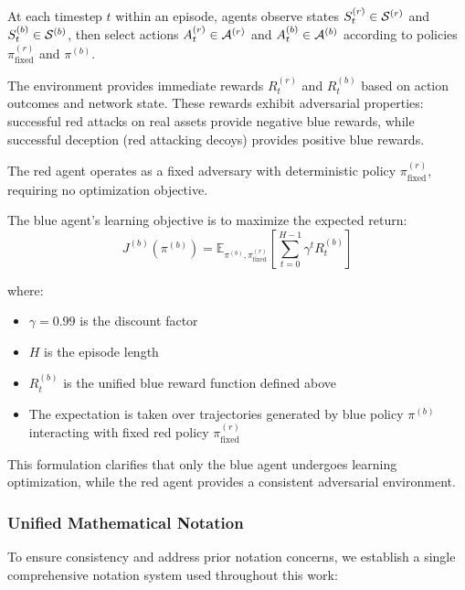\documentclass[12pt,oneside]{article}
\begin{document}
At each timestep $t$ within an episode, agents observe states $S_t^{(r)} \in \mathcal{S}^{(r)}$ and $S_t^{(b)} \in \mathcal{S}^{(b)}$, then select actions $A_t^{(r)} \in \mathcal{A}^{(r)}$ and $A_t^{(b)} \in \mathcal{A}^{(b)}$ according to policies $\pi^{(r)}_{\text{fixed}}$ and $\pi^{(b)}$.

The environment provides immediate rewards $R_t^{(r)}$ and $R_t^{(b)}$ based on action outcomes and network state. These rewards exhibit adversarial properties: successful red attacks on real assets provide negative blue rewards, while successful deception (red attacking decoys) provides positive blue rewards.

The red agent operates as a fixed adversary with deterministic policy $\pi^{(r)}_{\text{fixed}}$, requiring no optimization objective.

The blue agent's learning objective is to maximize the expected return:
\begin{equation}
J^{(b)}(\pi^{(b)}) = \mathbb{E}_{\pi^{(b)}, \pi^{(r)}_{\text{fixed}}}\left[\sum_{t=0}^{H-1} \gamma^t R_t^{(b)}\right]
\end{equation}

where:
\begin{itemize}
\item $\gamma = 0.99$ is the discount factor
\item $H$ is the episode length 
\item $R_t^{(b)}$ is the unified blue reward function defined above
\item The expectation is taken over trajectories generated by blue policy $\pi^{(b)}$ interacting with fixed red policy $\pi^{(r)}_{\text{fixed}}$
\end{itemize}

This formulation clarifies that only the blue agent undergoes learning optimization, while the red agent provides a consistent adversarial environment.

\subsubsection{Unified Mathematical Notation}

To ensure consistency and address prior notation concerns, we establish a single comprehensive notation system used throughout this work:
\end{document}
